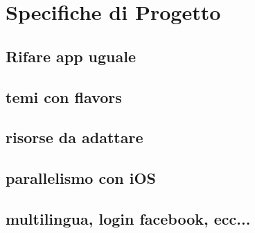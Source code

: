 \section{Specifiche di Progetto}


\subsection{Rifare app uguale}

\subsection{temi con flavors}

\subsection{risorse da adattare}

\subsection{parallelismo con iOS}

\subsection{multilingua, login facebook, ecc...}
\newpage